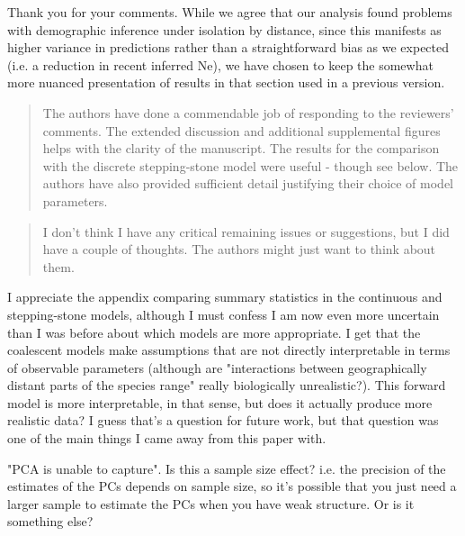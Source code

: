 Thank you for your comments. While we agree that our analysis found problems with demographic inference under isolation by distance, since this manifests as higher variance in predictions rather than a straightforward bias as we expected (i.e. a reduction in recent inferred Ne), we have chosen to keep the somewhat more nuanced presentation of results in that section used in a previous version. 



\begin{quote}
The authors have done a commendable job of responding to the reviewers' comments. The extended discussion and additional supplemental figures helps with the clarity of the manuscript. The results for the comparison with the discrete stepping-stone model were useful - though see below. The authors have also provided sufficient detail justifying their choice of model parameters.
\end{quote}

\begin{quote}
I don't think I have any critical remaining issues or suggestions, but I did have a couple of thoughts. The authors might just want to think about them.
\end{quote}

\begin{point}{}
I appreciate the appendix comparing summary statistics in the continuous and stepping-stone models, although I must confess I am now even more uncertain than I was before about which models are more appropriate. I get that the coalescent models make assumptions that are not directly interpretable in terms of observable parameters (although are "interactions between geographically distant parts of the species range" really biologically unrealistic?). This forward model is more interpretable, in that sense, but does it actually produce more realistic data? I guess that's a question for future work, but that question was one of the main things I came away from this paper with.
\end{point}


\begin{point}{\revref}
 "PCA is unable to capture". Is this a sample size effect? i.e. the precision of the estimates of the PCs depends on sample size, so it's possible that you just need a larger sample to estimate the PCs when you have weak structure. Or is it something else?
\end{point}

